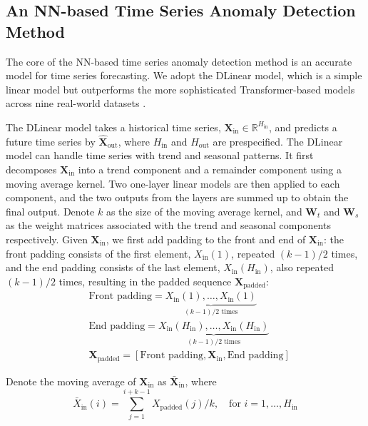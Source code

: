 \documentclass[11pt]{article}
\begin{document}


\subsection{An NN-based Time Series Anomaly Detection Method} 
 The core of the NN-based time series anomaly detection method is an accurate model for time series forecasting. We adopt the DLinear model, which is a simple linear model but outperforms the more sophisticated Transformer-based models across nine real-world datasets \citep{zeng2023transformers}.
 
The DLinear model takes a historical time series, $\bm{X}_{\mathrm{in}} \in \mathbb{R}^{H_{\mathrm{in}}}$, and predicts a future time series by $\hat{\bm{X}}_{\mathrm{out}}$, where $H_{\mathrm{in}}$ and $H_{\mathrm{out}}$ are prespecified. The DLinear model can handle time series with trend and seasonal patterns. It first decomposes $\bm{X}_{\mathrm{in}}$ into a trend component and a remainder component using a moving average kernel. Two one-layer linear models are then applied to each component, and the two outputs from the layers are summed up to obtain the final output. Denote $k$ as the size of the moving average kernel, and $\bm{W}_{t}$ and $\bm{W}_{s}$ as the weight matrices associated with the trend and seasonal components respectively. Given $\bm{X}_{\mathrm{in}}$, we first add padding to the front and end of $\bm{X}_{\mathrm{in}}$: the front padding consists of the first element, $X_{\mathrm{in}}(1)$, repeated $(k-1)/2$ times, and the end padding consists of the last element, $X_{\mathrm{in}}(H_{\mathrm{in}})$, also repeated $(k-1)/2$ times, resulting in the padded sequence $\bm{X}_{\mathrm{padded}}$:
\begin{align}
&\text{Front padding} = \underbrace{X_{\mathrm{in}}(1), \ldots, X_{\mathrm{in}}(1)}_{(k-1)/2 \text{ times}}\\
&\text{End padding} = \underbrace{X_{\mathrm{in}}(H_{\mathrm{in}}), \ldots, X_{\mathrm{in}}(H_{\mathrm{in}})}_{(k-1)/2 \text{ times}}\\
&\bm{X}_{\mathrm{padded}} = [\text{Front padding}, \bm{X}_{\mathrm{in}}, \text{End padding}]
\end{align}

Denote the moving average of $\bm{X}_{\mathrm{in}}$ as $\bar{\bm{X}}_{\mathrm{in}}$, where
\begin{equation}
	\bar{X}_{\mathrm{in}}(i) = \sum_{j=1}^{i+k-1}X_{\mathrm{padded}}(j)/k, \quad \text{for } i = 1, \ldots, H_{\mathrm{in}}
\end{equation}
\end{document}
